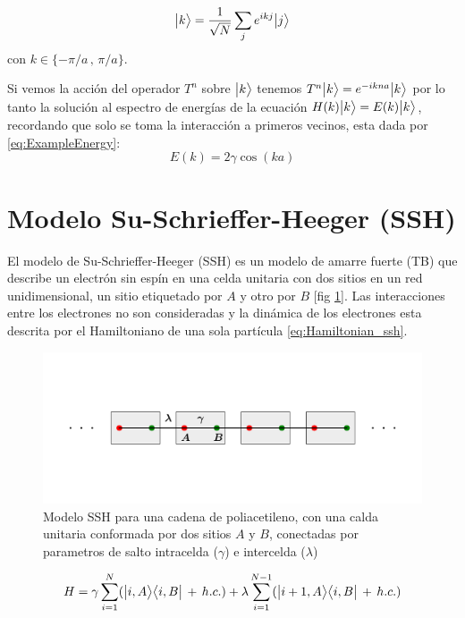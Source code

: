     \begin{equation}
        \label{eq:BlochFunctions}
        \big |{k}\big \rangle = \frac{1}{\sqrt{N}} \sum_j e^{ikj} \big |{j}\big \rangle 
    \end{equation}
    con $k \in \{-\pi/a\,,\,\pi/a\}$.
    
    Si vemos la acción del operador $T^n$ sobre $\big |{k}\big \rangle$ tenemos $T^n \big |{k}\big \rangle =  e^{-ikna}\big |{k}\big \rangle$ 
    por lo tanto la solución al espectro de energías de la ecuación $H(k)\big |{k}\big \rangle = E(k)\big |{k}\big \rangle$, recordando que solo se toma la interacción a primeros vecinos, esta dada por \eqref{eq:ExampleEnergy}:
    \begin{equation}
        \label{eq:ExampleEnergy}
        E(k) = 2\gamma \cos(ka)
    \end{equation}
    
\section{Modelo Su-Schrieffer-Heeger (SSH)}
    

El modelo de Su-Schrieffer-Heeger (SSH) es un modelo de amarre fuerte (TB) que describe un electrón sin espín en una celda unitaria con dos sitios en un red unidimensional, un sitio etiquetado por $A$ y otro por $B$ [fig \ref{fig:SSH_Fig}]. Las interacciones entre los electrones no son consideradas y la dinámica de los electrones esta descrita por el Hamiltoniano de una sola partícula \eqref{eq:Hamiltonian_ssh}.

\begin{figure}[tbh!]
    \centering
    \includegraphics[width=\textwidth]{Imagenes/Models/SSH_example.pdf}\vspace{-1.5cm}
    \caption{Modelo SSH para una cadena de poliacetileno, con una calda unitaria conformada por dos sitios $A$ y $B$, conectadas por parametros de salto intracelda ($\gamma$) e intercelda ($\lambda$)}
    \label{fig:SSH_Fig}
\end{figure}


\begin{equation}
    \label{eq:Hamiltonian_ssh}
    H = \gamma \sum_{i=1}^N (\big |{i,A}\big \rangle\big \langle{i,B}\big | \,+\, h.c. ) + \lambda \sum_{i=1}^{N-1} (\big |{i + 1,A}\big \rangle\big \langle{i,B}\big | \,+\, h.c. ) 
\end{equation}

